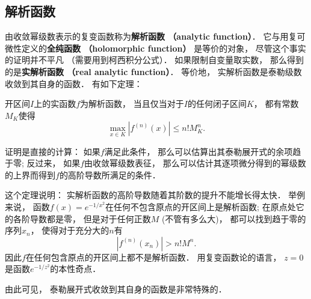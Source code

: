 \subsection{解析函数}
由收敛幂级数表示的复变函数称为\textbf{解析函数 （analytic function）}． 它与用复可微性定义的\textbf{全纯函数 （holomorphic function）} 是等价的对象， 尽管这个事实的证明并不平凡 （需要用到柯西积分公式）． 如果限制自变量取实数， 那么得到的是\textbf{实解析函数 （real analytic function）}． 等价地， 实解析函数是泰勒级数收敛到其自身的函数． 有如下定理：

\begin{theorem}{}
开区间$I$上的实函数$f$为解析函数， 当且仅当对于$I$的任何闭子区间$K$， 都有常数$M_K$使得
$$
\max_{x\in K}|f^{(n)}(x)|\leq n!M_K^n.
$$
\end{theorem}

证明是直接的计算： 如果$f$满足此条件， 那么可以估算出其泰勒展开式的余项趋于零; 反过来， 如果$f$由收敛幂级数表征， 那么可以估计其逐项微分得到的幂级数的上界而得到$f$的高阶导数所满足的条件．

这个定理说明： 实解析函数的高阶导数随着其阶数的提升不能增长得太快． 举例来说， 函数$f(x)=e^{-1/x^2}$在任何不包含原点的开区间上是解析函数; 在原点处它的各阶导数都是零， 但是对于任何正数$M$ (不管有多么大)， 都可以找到趋于零的序列$x_n$， 使得对于充分大的$n$有
$$
|f^{(n)}(x_n)|>n!M^n.
$$
因此$f$在任何包含原点的开区间上都不是解析函数． 用复变函数论的语言， $z=0$是函数$e^{-1/z^2}$的本性奇点．

由此可见， 泰勒展开式收敛到其自身的函数是非常特殊的．
